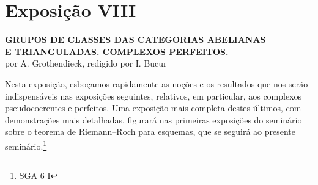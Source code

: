 \newpage
\section*{Exposição VIII}

\begin{center}
\textbf{GRUPOS DE CLASSES DAS CATEGORIAS ABELIANAS}\\
\textbf{E TRIANGULADAS. COMPLEXOS PERFEITOS.}\\[1ex]
por A. Grothendieck, redigido por I. Bucur
\end{center}

Nesta exposição, esboçamos rapidamente as noções e os resultados que nos serão indispensáveis nas exposições seguintes, relativos, em particular, aos complexos pseudocoerentes e perfeitos. Uma exposição mais completa destes últimos, com demonstrações mais detalhadas, figurará nas primeiras exposições do seminário sobre o teorema de Riemann--Roch para esquemas, que se seguirá ao presente seminário.\footnote{SGA 6 I}
